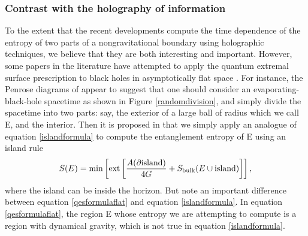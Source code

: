 \documentclass[12pt]{article}
\def\gnewt{G}
\newcommand{\be}{\begin{equation}}
\newcommand{\ee}{\end{equation}}
\begin{document}
\subsubsection{Contrast with the holography of information}
To the extent that the recent developments compute the time dependence of the entropy of two parts of a nongravitational boundary using holographic techniques, we believe that they are both interesting and important. However, some papers in the literature have  attempted to apply the quantum extremal surface prescription to black holes in asymptotically flat space \cite{Krishnan:2020oun,Hashimoto:2020cas,Gautason:2020tmk,Alishahiha:2020qza}. For instance, the Penrose diagrams of   \cite{Almheiri:2020cfm} appear to suggest that one should consider an evaporating-black-hole spacetime as shown in Figure \ref{randomdivision}, and simply divide the spacetime into two parts: say, the exterior of a large ball of radius which we call E, and the interior. Then it is proposed in \cite{Almheiri:2020cfm} that we simply apply an analogue of equation \eqref{islandformula} to compute the entanglement entropy of E using an island rule
\be
\label{qesformulaflat}
S(E) = \text{min}\left[ \text{ext} \left[{A(\partial \text{island}) \over 4 \gnewt} + S_{\text{bulk}}(E \cup \text{island}) \right]\right],
\ee
where the island can be inside the horizon.
But note an important difference between equation \eqref{qesformulaflat} and equation \eqref{islandformula}. In equation \eqref{qesformulaflat}, the region E whose entropy we are attempting to compute is a region with dynamical gravity, which is not true in equation \eqref{islandformula}. 
\end{document}
